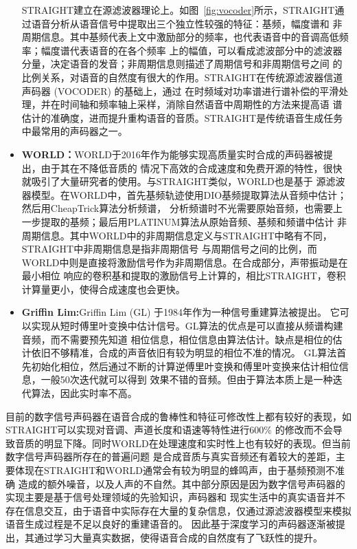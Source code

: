 \begin{itemize}
    STRAIGHT建立在源滤波器理论上。如图~\ref{fig:vocoder}所示，STRAIGHT通过语音分析从语音信号中提取出三个独立性较强的特征：基频，幅度谱和
    非周期信息。其中基频代表上文中激励部分的频率，也代表语音中的音调高低频率；幅度谱代表语音的在各个频率
    上的幅值，可以看成滤波部分中的滤波器分量，决定语音的发音；非周期信息则描述了周期信号和非周期信号之间
    的比例关系，对语音的自然度有很大的作用。STRAIGHT在传统源滤波器信道声码器 (VOCODER) 的基础上，通过
    在时频域对功率谱进行谱补偿的平滑处理，并在时间轴和频率轴上采样，消除自然语音中周期性的方法来提高语
    谱估计的准确度，进而提升重构语音的音质\cite{杨骋基于简化}。STRAIGHT是传统语音生成任务中最常用的声码器之一。
    \item \textbf{WORLD：}WORLD于2016年作为能够实现高质量实时合成的声码器被提出，由于其在不降低音质的
    情况下高效的合成速度和免费开源的特性，很快就吸引了大量研究者的使用\cite{morise2016world}。与STRAIGHT类似，WORLD也是基于
    源滤波器模型。在WORLD中，首先基频轨迹使用DIO基频提取算法从音频中估计；然后用CheapTrick算法分析频谱，
    分析频谱时不光需要原始音频，也需要上一步提取的基频；最后用PLATINUM算法从原始音频、基频和频谱中估计
    非周期信息。其中WORLD中的非周期信息定义与STRAIGHT中略有不同，STRAIGHT中非周期信息是指非周期信号
    与周期信号之间的比例，而WORLD中则是直接将激励信号作为非周期信息。在合成部分，声带振动是在最小相位
    响应的卷积基和提取的激励信号上计算的，相比STRAIGHT，卷积计算量更小，使得合成速度也会更快。
    \item \textbf{Griffin Lim:}Griffin Lim (GL) 于1984年作为一种信号重建算法被提出\cite{griffin1984signal}。
    它可以实现从短时傅里叶变换中估计信号。GL算法的优点是可以直接从频谱构建音频，而不需要预先知道
    相位信息，相位信息由算法估计。缺点是相位的估计依旧不够精准，合成的声音依旧有较为明显的相位不准的情况。
    GL算法首先初始化相位，然后通过不断的计算逆傅里叶变换和傅里叶变换来估计相位信息，一般50次迭代就可以得到
    效果不错的音频。但由于算法本质上是一种迭代算法，因此实时率不高。
\end{itemize}

目前的数字信号声码器在语音合成的鲁棒性和特征可修改性上都有较好的表现，如STRAIGHT可以实现对音调、声道长度和语速等特性进行600\%
的修改而不会导致音质的明显下降。同时WORLD在处理速度和实时性上也有较好的表现。但当前数字信号声码器所存在的普遍问题
是合成音质与真实音频还有着较大的差距，主要体现在STRAIGHT和WORLD通常会有较为明显的蜂鸣声，由于基频预测不准确
造成的额外噪音，以及人声的不自然。其中部分原因是因为数字信号声码器的实现主要是基于信号处理领域的先验知识，声码器和
现实生活中的真实语音并不存在信息交互，由于语音中实际存在大量的复杂信息，仅通过源滤波器模型来模拟语音生成过程是不足以良好的重建语音的。
因此基于深度学习的声码器逐渐被提出，其通过学习大量真实数据，使得语音合成的自然度有了飞跃性的提升。

